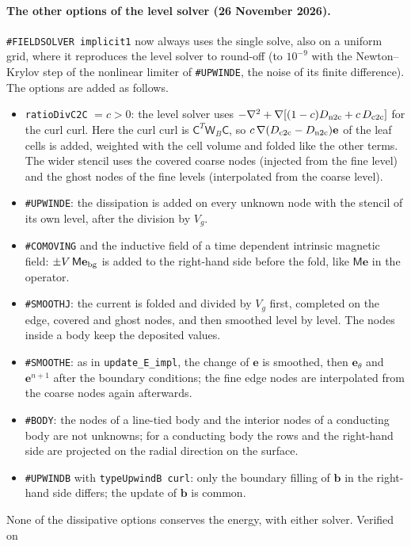 \documentclass[a4paper,11pt]{article}
\newcommand{\code}[1]{\texttt{#1}}
\newcommand{\EE}{\mathbf{e}}
\newcommand{\BB}{\mathbf{b}}
\newcommand{\Cm}{\mathsf{C}}
\newcommand{\Mm}{\mathsf{M}}
\newcommand{\Wb}{\mathsf{W}_B}
\begin{document}
\paragraph{The other options of the level solver (26 November 2026).}
\code{\#FIELDSOLVER implicit1} now always uses the single solve, also on a uniform
grid, where it reproduces the level solver to round-off (to $10^{-9}$ with the
Newton--Krylov step of the nonlinear limiter of \code{\#UPWINDE}, the noise of its
finite difference). The options are added as follows.
\begin{itemize}
\item \code{ratioDivC2C} $=c>0$: the level solver uses
  $-\nabla^2+\nabla[(1-c)D_{\rm n2c}+c\,D_{\rm c2c}]$ for the curl curl. Here the
  curl curl is $\Cm^T\Wb\Cm$, so $c\,\nabla(D_{\rm c2c}-D_{\rm n2c})\EE$ of the leaf
  cells is added, weighted with the cell volume and folded like the other terms.
  The wider stencil uses the covered coarse nodes (injected from the fine level)
  and the ghost nodes of the fine levels (interpolated from the coarse level).
\item \code{\#UPWINDE}: the dissipation is added on every unknown node with the
  stencil of its own level, after the division by $V_g$.
\item \code{\#COMOVING} and the inductive field of a time dependent intrinsic
  magnetic field: $\pm V\,\Mm\EE_{\rm bg}$ is added to the right-hand side before
  the fold, like $\Mm\EE$ in the operator.
\item \code{\#SMOOTHJ}: the current is folded and divided by $V_g$ first, completed
  on the edge, covered and ghost nodes, and then smoothed level by level. The
  nodes inside a body keep the deposited values.
\item \code{\#SMOOTHE}: as in \code{update\_E\_impl}, the change of $\EE$ is
  smoothed, then $\EE_\theta$ and $\EE^{n+1}$ after the boundary conditions; the
  fine edge nodes are interpolated from the coarse nodes again afterwards.
\item \code{\#BODY}: the nodes of a line-tied body and the interior nodes of a
  conducting body are not unknowns; for a conducting body the rows and the
  right-hand side are projected on the radial direction on the surface.
\item \code{\#UPWINDB} with \code{typeUpwindB curl}: only the boundary filling of
  $\BB$ in the right-hand side differs; the update of $\BB$ is common.
\end{itemize}
None of the dissipative options conserves the energy, with either solver. Verified on
\end{document}
